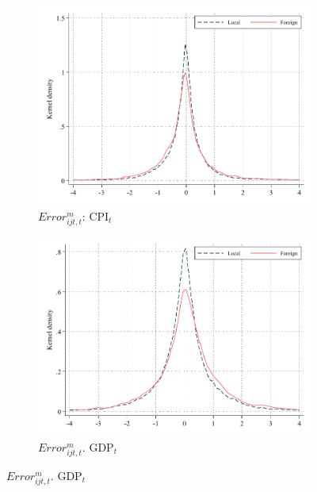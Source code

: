 \documentclass[letterpaper,12pt]{article}
\begin{document}
\begin{figure}[h]
	
		\begin{subfigure}[b]{0.48\textwidth}
		\centering
		\includegraphics[width=1\linewidth]{../output/figures/cpi_current_FE_density}
		\caption{$Error_{ijt,t}^m$: $\text{CPI}_t$ }
		\label{fig:error_density_cpi_c}
	\end{subfigure}
	\hfill
	\begin{subfigure}[b]{0.48\textwidth}
		\centering
		\includegraphics[width=1\linewidth]{../output/figures/gdp_current_FE_density}
		\caption{$Error_{ijt,t}^m$. $\text{GDP}_t$ }
		\label{fig:error_density_gdp_c}
	\end{subfigure}
	

\end{figure}
\end{document}
